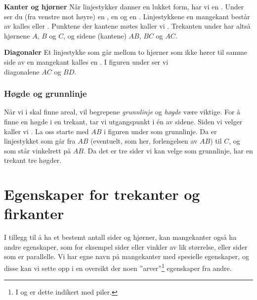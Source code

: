 \begin{comment}
\reg[Samsvarande vinklar]{
	Vinkler med eit høgre eller venstre vinkelbein felles, kallast \textit{samsvarende vinkler}. I figuren under er dei markerte vinklane samsvarande fordi alle tre har den raude linja som venstre vinkelbein.
\fig{vink4}
	Vinklar med parvis parallelle høgre og venstre vinkelbein er like store.
\fig{vink4b}
}
\end{comment}
\newpage
\textbf{Kanter og hjørner} \os
Når linjestykker danner en lukket form, har vi en . Under ser du (fra venstre mot høyre) en , en  og en .
Linjestykkene en mangekant består av kalles  eller . Punktene der kantene møtes kaller vi . Trekanten under har altså hjørnene $ A $, $ B $ og $ C $, og sidene (kantene) $ AB $, $ BC $ og $ AC $.
 \vsk

\textbf{Diagonaler} \os
Et linjestykke som går mellom to hjørner som ikke hører til samme side av en mangekant kalles en . I figuren under ser vi \\diagonalene $ AC $ og $ BD $.
\newpage
\subsubsection{Høgde og grunnlinje \label{grunnlinje}}
Når vi i  skal finne areal, vil begrepene \textit{grunnlinje} og \textit{høgde} være viktige. For å finne en høgde i en trekant, tar vi utgangspunkt i én av sidene. Siden vi velger kaller vi . La oss starte med $ AB $ i figuren under som grunnlinje. Da er  linjestykket som går fra $ AB $ (eventuelt, som her, forlengelsen av $ AB $) til $ C $, og som står vinkelrett på $ AB $.
Da det er tre sider vi kan velge som grunnlinje, har en trekant tre høgder.
\section{Egenskaper for trekanter og firkanter}
I tillegg til å ha et bestemt antall sider og hjørner, kan mangekanter også ha andre egenskaper, som for eksempel sider eller vinkler av lik størrelse, eller sider som er parallelle. Vi har egne navn på mangekanter med spesielle egenskaper, og disse kan vi sette opp i en oversikt der noen ''arver''\footnote{I  og  er dette indikert med piler.} egenskaper fra andre.\regv


